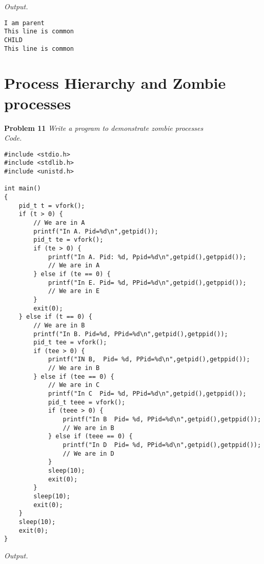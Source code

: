 \documentclass[12pt]{article}
\begin{document}
\textit{Output.}
\begin{lstlisting}
I am parent
This line is common
CHILD
This line is common
\end{lstlisting}

\section{Process Hierarchy and Zombie processes}

\textbf{Problem 11} \textit{Write a program to demonstrate zombie processes}\\

\textit{Code.}

\begin{lstlisting}
#include <stdio.h>
#include <stdlib.h>
#include <unistd.h>

int main()
{
	pid_t t = vfork();
	if (t > 0) {
		// We are in A
		printf("In A. Pid=%d\n",getpid());
		pid_t te = vfork();
		if (te > 0) {
			printf("In A. Pid: %d, Ppid=%d\n",getpid(),getppid());
			// We are in A
		} else if (te == 0) {
			printf("In E. Pid= %d, PPid=%d\n",getpid(),getppid());
			// We are in E
		}
		exit(0);
	} else if (t == 0) {
		// We are in B
		printf("In B. Pid=%d, PPid=%d\n",getpid(),getppid());
		pid_t tee = vfork();
		if (tee > 0) {
			printf("IN B,  Pid= %d, PPid=%d\n",getpid(),getppid());
			// We are in B
		} else if (tee == 0) {
			// We are in C
			printf("In C  Pid= %d, PPid=%d\n",getpid(),getppid());
			pid_t teee = vfork();
			if (teee > 0) {
				printf("In B  Pid= %d, PPid=%d\n",getpid(),getppid());
				// We are in B
			} else if (teee == 0) {
				printf("In D  Pid= %d, PPid=%d\n",getpid(),getppid());
				// We are in D
			}
			sleep(10);
			exit(0);
		}
		sleep(10);
		exit(0);
	}
	sleep(10);
	exit(0);
}
\end{lstlisting}

\textit{Output.}
\begin{lstlisting}
\end{lstlisting}
\end{document}
